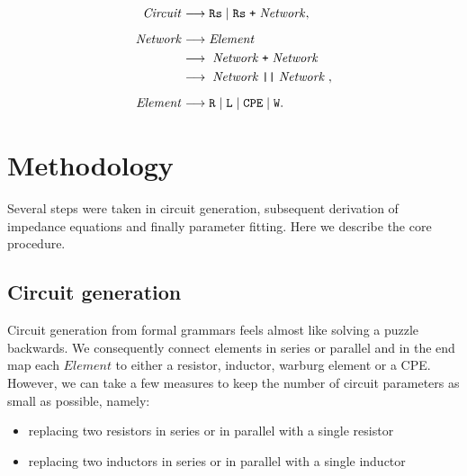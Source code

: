 \documentclass[
    11pt,
    a4paper,
    oneside
]{article}
\newcommand{\nt}[1]{\mathit{#1}}
\newcommand{\term}[1]{\text{\texttt{#1}}}
\begin{document}
\begin{equation}
\label{eq:grammar-relaxed}
\begin{aligned}
\nt{Circuit}
    &\longrightarrow
    \term{Rs}
    \mid
    \term{Rs}\;\term{+}\;\nt{Network},
    \\[2mm]
\nt{Network}
    &\longrightarrow
    \nt{Element}
    \\%
    &\longrightarrow\;\nt{Network}\;\term{+}\;\nt{Network}\;
    \\
    &\longrightarrow%
    \;\nt{Network}\;\term{||}\;\nt{Network}\;,
    \\[2mm]
\nt{Element}
    &\longrightarrow
    \term{R}
    \mid \term{L}
    \mid \term{CPE}
    \mid \term{W}.
\end{aligned}
\end{equation}

%
%


\section{Methodology}

Several steps were taken in circuit generation, subsequent derivation of impedance equations and finally parameter fitting.
Here we describe the core procedure.

\subsection{Circuit generation}

Circuit generation from formal grammars feels almost like solving a puzzle backwards. We consequently connect elements in series or parallel
and in the end map each $\nt{Element}$ to either a resistor, inductor, warburg element or a CPE. However, we can take a few measures to 
keep the number of circuit parameters as small as possible, namely:
\begin{itemize}
    \item replacing two resistors in series or in parallel with a single resistor
    \item replacing two inductors in series or in parallel with a single inductor
\end{itemize}
\end{document}
